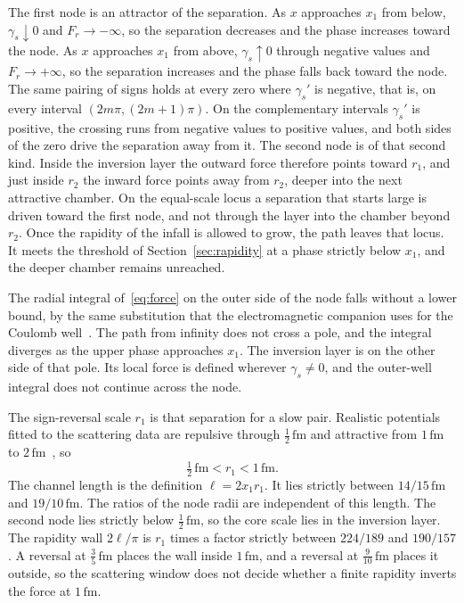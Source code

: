 \documentclass[a4paper]{article}
\begin{document}
The first node is an attractor of the separation. As \(x\) approaches \(x_1\) from below, \(\gamma_s\downarrow 0\) and \(F_r\to-\infty\), so the separation decreases and the phase increases toward the node. As \(x\) approaches \(x_1\) from above, \(\gamma_s\uparrow 0\) through negative values and \(F_r\to+\infty\), so the separation increases and the phase falls back toward the node. The same pairing of signs holds at every zero where \(\gamma_s'\) is negative, that is, on every interval \((2m\pi,(2m+1)\pi)\). On the complementary intervals \(\gamma_s'\) is positive, the crossing runs from negative values to positive values, and both sides of the zero drive the separation away from it. The second node is of that second kind. Inside the inversion layer the outward force therefore points toward \(r_1\), and just inside \(r_2\) the inward force points away from \(r_2\), deeper into the next attractive chamber. On the equal-scale locus a separation that starts large is driven toward the first node, and not through the layer into the chamber beyond \(r_2\). Once the rapidity of the infall is allowed to grow, the path leaves that locus. It meets the threshold of Section~\ref{sec:rapidity} at a phase strictly below \(x_1\), and the deeper chamber remains unreached.

The radial integral of~\eqref{eq:force} on the outer side of the node falls without a lower bound, by the same substitution that the electromagnetic companion uses for the Coulomb well~\cite{dst-shell}. The path from infinity does not cross a pole, and the integral diverges as the upper phase approaches \(x_1\). The inversion layer is on the other side of that pole. Its local force is defined wherever \(\gamma_s\neq 0\), and the outer-well integral does not continue across the node.

The sign-reversal scale \(r_1\) is that separation for a slow pair. Realistic potentials fitted to the scattering data are repulsive through \(\tfrac12\,\mathrm{fm}\) and attractive from \(1\,\mathrm{fm}\) to \(2\,\mathrm{fm}\)~\cite{wiringa1995}, so
\[
\tfrac12\,\mathrm{fm}<r_1<1\,\mathrm{fm}.
\]
The channel length is the definition \(\ell=2x_1 r_1\). It lies strictly between \(14/15\,\mathrm{fm}\) and \(19/10\,\mathrm{fm}\). The ratios of the node radii are independent of this length. The second node lies strictly below \(\tfrac12\,\mathrm{fm}\), so the core scale lies in the inversion layer. The rapidity wall \(2\ell/\pi\) is \(r_1\) times a factor strictly between \(224/189\) and \(190/157\). A reversal at \(\tfrac35\,\mathrm{fm}\) places the wall inside \(1\,\mathrm{fm}\), and a reversal at \(\tfrac9{10}\,\mathrm{fm}\) places it outside, so the scattering window does not decide whether a finite rapidity inverts the force at \(1\,\mathrm{fm}\).
\end{document}
